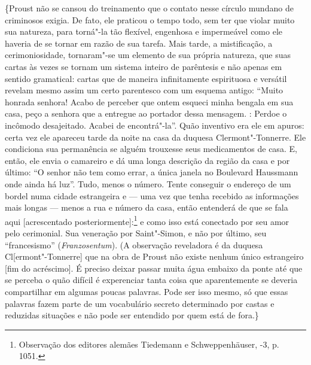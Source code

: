 \{Proust não se cansou do treinamento que o contato nesse círculo
mundano de criminosos exigia. De fato, ele praticou o tempo todo, sem
ter que violar muito sua natureza, para torná"-la tão flexível, engenhosa
e impermeável como ele haveria de se tornar em razão de sua tarefa.
Mais tarde, a mistificação, a cerimoniosidade, tornaram"-se um elemento de
sua própria natureza, que suas cartas às vezes se tornam um sistema
inteiro de parêntesis e não apenas em sentido gramatical: cartas que de
maneira infinitamente espirituosa e versátil revelam mesmo assim um
certo parentesco com um esquema antigo: ``Muito honrada senhora! Acabo
de perceber que ontem esqueci minha bengala em sua casa, peço a senhora
que a entregue ao portador dessa mensagem. : Perdoe o incômodo
desajeitado. Acabei de encontrá"-la''. Quão inventivo era ele em apuros:
certa vez ele apareceu tarde da noite na casa da duquesa
Clermont"-Tonnerre. Ele condiciona sua permanência se alguém trouxesse
seus medicamentos de casa. E, então, ele envia o camareiro e dá uma
longa descrição da região da casa e por último: ``O senhor não tem como
errar, a única janela no Boulevard Haussmann onde ainda há luz''. Tudo,
menos o número. Tente conseguir o endereço de um bordel numa cidade
estrangeira e --- uma vez que tenha recebido as informações mais longas ---
menos a rua e número da casa, então entenderá de que se fala aqui
{[}acrescentado posteriormente{]}:\footnote{Observação dos editores
  alemães Tiedemann e Schweppenhäuser, -3, p. 1051. \versal{[N. E.]}} e
como isso está conectado por seu amor pelo cerimonial. Sua veneração por
Saint"-Simon, e não por último, seu ``francesismo'' (\emph{Franzosentum}).
(A observação reveladora é da duquesa Cl{[}ermont"-Tonnerre{]} que na
obra de Proust não existe nenhum único estrangeiro {[}fim do
acréscimo{]}. É preciso deixar passar muita água embaixo da ponte até
que se perceba o quão difícil é experenciar tanta coisa que
aparentemente se deveria compartilhar em algumas poucas palavras. Pode
ser isso mesmo, só que essas palavras fazem parte de um vocabulário
secreto determinado por castas e reduzidas situações e não pode ser
entendido por quem está de fora.\}

